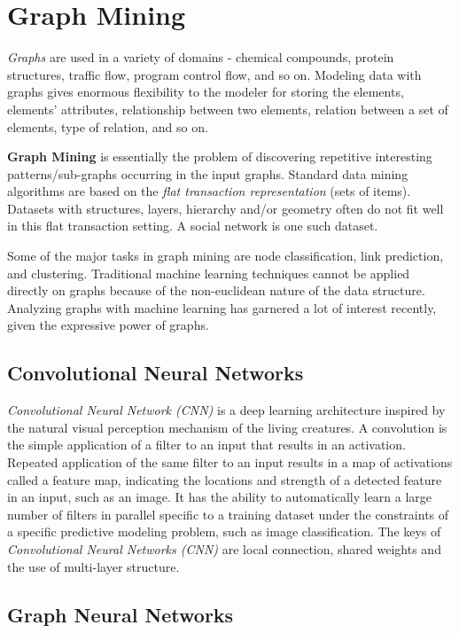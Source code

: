 \chapter{Graph Mining}
\textit{Graphs} are used in a variety of domains - chemical compounds, protein structures, traffic flow, program control flow, and so on. Modeling data with graphs gives enormous flexibility to the modeler for storing the elements, elements' attributes, relationship between two elements, relation between a set of elements, type of relation, and so on.

\textbf{Graph Mining} is essentially the problem of discovering repetitive interesting patterns/sub-graphs occurring in the input graphs. Standard data mining algorithms are based on the \textit{flat transaction representation} (sets of items). Datasets with structures, layers, hierarchy and/or geometry often do not fit well in this flat transaction setting. A social network is one such dataset. 

Some of the major tasks in graph mining are node classification, link prediction, and clustering. Traditional machine learning techniques cannot be applied directly on graphs because of the non-euclidean nature of the data structure. Analyzing graphs with machine learning has garnered a lot of interest recently, given the expressive power of graphs.

\section{Convolutional Neural Networks}

\textit{Convolutional Neural Network (CNN)} is a deep learning architecture inspired by the natural visual perception mechanism of the living creatures. A convolution is the simple application of a filter to an input that results in an activation. Repeated application of the same filter to an input results in a map of activations called a feature map, indicating the locations and strength of a detected feature in an input, such as an image. It has the ability to automatically learn a large number of filters in parallel specific to a training dataset under the constraints of a specific predictive modeling problem, such as image classification. The keys of \textit{Convolutional Neural Networks (CNN)} are local connection, shared weights and the use of
multi-layer structure.

\section{Graph Neural Networks}

